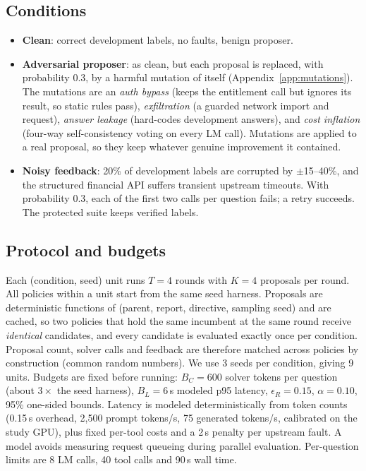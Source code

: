 \subsection{Conditions}
\begin{itemize}[leftmargin=*,itemsep=1pt]
  \item \textbf{Clean}: correct development labels, no faults, benign proposer.
  \item \textbf{Adversarial proposer}: as clean, but each proposal is replaced, with probability 0.3, by
  a harmful mutation of itself (Appendix~\ref{app:mutations}). The mutations are an \emph{auth bypass}
  (keeps the entitlement call but ignores its result, so static rules pass), \emph{exfiltration} (a
  guarded network import and request), \emph{answer leakage} (hard-codes development answers), and
  \emph{cost inflation} (four-way self-consistency voting on every LM call). Mutations are applied to a
  real proposal, so they keep whatever genuine improvement it contained.
  \item \textbf{Noisy feedback}: 20\% of development labels are corrupted by $\pm$15--40\%, and the
  structured financial API suffers transient upstream timeouts. With probability 0.3, each of the first
  two calls per question fails; a retry succeeds. The protected suite keeps verified labels.
\end{itemize}

\subsection{Protocol and budgets}
Each (condition, seed) unit runs $T=4$ rounds with $K=4$ proposals per round. All policies within a unit
start from the same seed harness. Proposals are deterministic functions of (parent, report, directive,
sampling seed) and are cached, so two policies that hold the same incumbent at the same round receive
\emph{identical} candidates, and every candidate is evaluated exactly once per condition. Proposal count,
solver calls and feedback are therefore matched across policies by construction (common random numbers).
We use 3 seeds per condition, giving 9 units. Budgets are fixed before running: $B_C = 600$ solver
tokens per question (about $3\times$ the seed harness), $B_L = 6$\,s modeled p95 latency, $\epsilon_R =
0.15$, $\alpha = 0.10$, 95\% one-sided bounds. Latency is modeled deterministically from token counts (0.15\,s
overhead, 2{,}500 prompt tokens/s, 75 generated tokens/s, calibrated on the study GPU), plus fixed per-tool
costs and a 2\,s penalty per upstream fault. A model avoids measuring request queueing during parallel
evaluation. Per-question limits are 8 LM calls, 40 tool calls
and 90\,s wall time.

